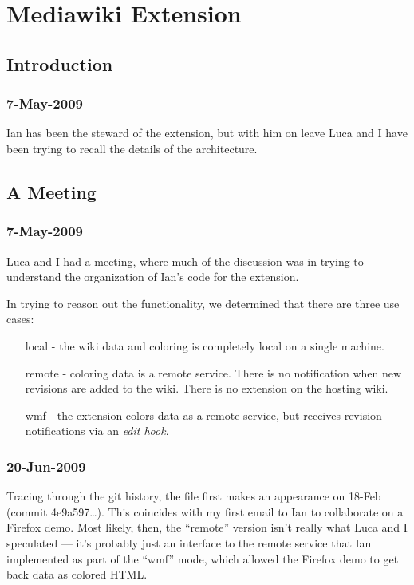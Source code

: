 \chapter{Mediawiki Extension}

\section{Introduction}

\subsection{7-May-2009}

Ian has been the steward of the 
extension, but with him on leave Luca and I have been
trying to recall the details of the architecture.

\section{A Meeting}

\subsection{7-May-2009}

Luca and I had a meeting, where much of the discussion was
in trying to understand the organization of Ian's code
for the extension.

In trying to reason out the functionality, we determined that
there are three use cases:
\begin{enumerate}
\item[local] - the wiki data and coloring is completely local on
	a single machine.
\item[remote] - coloring data is a remote service.
	There is no notification when new revisions are added to
	the wiki.  There is no extension on the hosting wiki.
\item[wmf] - the extension colors data as a remote service,
	but receives revision notifications via an \textit{edit hook}.
\end{enumerate}

\subsection{20-Jun-2009}

Tracing through the git history, the file 
first makes an appearance on 18-Feb (commit 4e9a597\ldots).
This coincides with my first email to Ian to collaborate on a Firefox demo.
Most likely, then, the ``remote'' version isn't really what Luca and
I speculated --- it's probably just an interface to the remote service
that Ian implemented as part of the ``wmf'' mode, which allowed the
Firefox demo to get back data as colored HTML.

